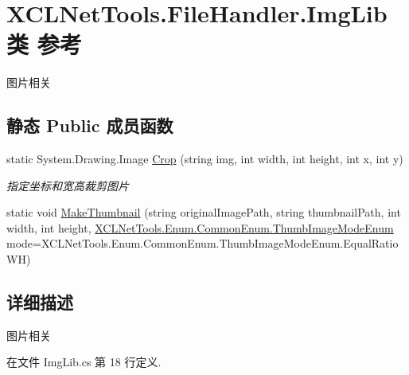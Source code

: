 \hypertarget{class_x_c_l_net_tools_1_1_file_handler_1_1_img_lib}{\section{X\-C\-L\-Net\-Tools.\-File\-Handler.\-Img\-Lib类 参考}
\label{class_x_c_l_net_tools_1_1_file_handler_1_1_img_lib}
}


图片相关  


\subsection*{静态 Public 成员函数}
\begin{DoxyCompactItemize}
\item 
static System.\-Drawing.\-Image \hyperlink{class_x_c_l_net_tools_1_1_file_handler_1_1_img_lib_ad00cc641f4f1585d61ce6c86962a6213}{Crop} (string img, int width, int height, int x, int y)
\begin{DoxyCompactList}\small\item\em 指定坐标和宽高裁剪图片 \end{DoxyCompactList}\item 
static void \hyperlink{class_x_c_l_net_tools_1_1_file_handler_1_1_img_lib_ab5403c4363f26a72cc0b98a4e86d5fa1}{Make\-Thumbnail} (string original\-Image\-Path, string thumbnail\-Path, int width, int height, \hyperlink{class_x_c_l_net_tools_1_1_enum_1_1_common_enum_abb6d9d6cd508fc9ced27b814afb38974}{X\-C\-L\-Net\-Tools.\-Enum.\-Common\-Enum.\-Thumb\-Image\-Mode\-Enum} mode=X\-C\-L\-Net\-Tools.\-Enum.\-Common\-Enum.\-Thumb\-Image\-Mode\-Enum.\-Equal\-Ratio\-W\-H)
\end{DoxyCompactItemize}


\subsection{详细描述}
图片相关 



在文件 Img\-Lib.\-cs 第 18 行定义.



